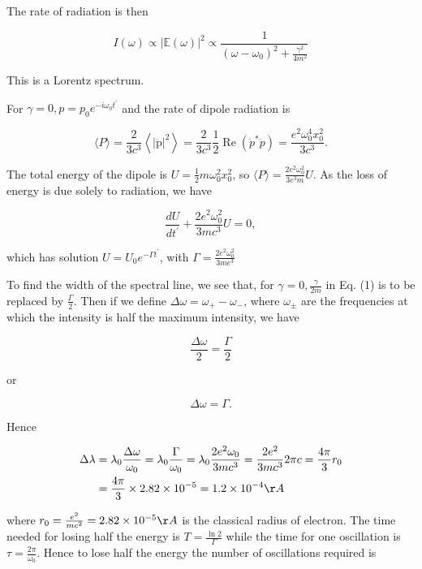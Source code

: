 \documentclass[10pt]{article}
\begin{document}
The rate of radiation is then

$$
I(\omega) \propto|\mathbb{E}(\omega)|^{2} \propto \frac{1}{\left(\omega-\omega_{0}\right)^{2}+\frac{\gamma^{2}}{4 m^{2}}}
$$

This is a Lorentz spectrum.

 For $\gamma=0, p=p_{0} e^{-i \omega_{0} t^{\prime}}$ and the rate of dipole radiation is

$$
\langle P\rangle=\frac{2}{3 c^{3}}\left\langle|\ddot{\mathrm{p}}|^{2}\right\rangle=\frac{2}{3 c^{3}} \frac{1}{2} \operatorname{Re}\left(\ddot{p}^{*} \ddot{p}\right)=\frac{e^{2} \omega_{0}^{4} x_{0}^{2}}{3 c^{3}} .
$$

The total energy of the dipole is $U=\frac{1}{2} m \omega_{0}^{2} x_{0}^{2}$, so $\langle P\rangle=\frac{2 e^{2} \omega_{0}^{2}}{3 e^{3} m} U$. As the loss of energy is due solely to radiation, we have

$$
\frac{d U}{d t^{\prime}}+\frac{2 e^{2} \omega_{0}^{2}}{3 m c^{3}} U=0,
$$

which has solution $U=U_{0} e^{-\Gamma t^{\prime}}$, with $\Gamma=\frac{2 e^{2} \omega_{0}^{2}}{3 m e^{3}}$

 To find the width of the spectral line, we see that, for $\gamma=0, \frac{\gamma}{2 m}$ in Eq.
(1) is to be replaced by $\frac{\Gamma}{2}$. Then if we define $\Delta \omega=\omega_{+}-\omega_{-}$, where $\omega_{\pm}$ are the frequencies at which the intensity is half the maximum intensity, we have

$$
\frac{\Delta \omega}{2}=\frac{\Gamma}{2}
$$

or

$$
\Delta \omega=\Gamma .
$$

Hence

$$
\begin{aligned}
\Delta \lambda &=\lambda_{0} \frac{\Delta \omega}{\omega_{0}}=\lambda_{0} \frac{\Gamma}{\omega_{0}}=\lambda_{0} \frac{2 e^{2} \omega_{0}}{3 m c^{3}}=\frac{2 e^{2}}{3 m c^{3}} 2 \pi c=\frac{4 \pi}{3} r_{0} \\
&=\frac{4 \pi}{3} \times 2.82 \times 10^{-5}=1.2 \times 10^{-4} \AA
\end{aligned}
$$

where $r_{0}=\frac{e^{2}}{m c^{2}}=2.82 \times 10^{-5} \AA$ is the classical radius of electron. The time needed for losing half the energy is $T=\frac{\ln 2}{\Gamma}$ while the time for one oscillation is $\tau=\frac{2 \pi}{\omega_{0}}$. Hence to lose half the energy the number of oscillations required is
\end{document}
